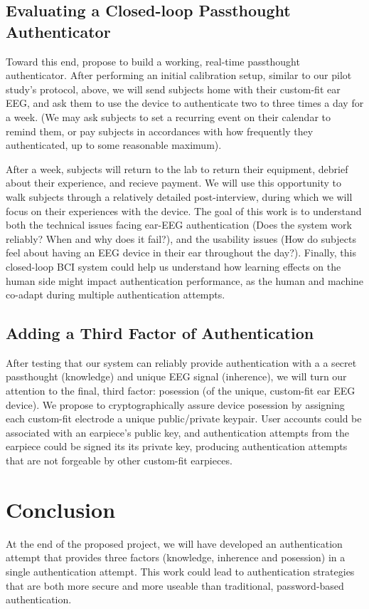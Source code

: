 \documentclass[11pt]{article}
\begin{document}
\subsection{Evaluating a Closed-loop Passthought Authenticator}
Toward this end, propose to build a working, real-time passthought authenticator.
After performing an initial calibration setup, similar to our pilot study's protocol, above,
we will send subjects home with their custom-fit ear EEG, and ask them to use the device to authenticate
two to three times a day for a week.
(We may ask subjects to set a recurring event on their calendar to remind them, 
or pay subjects in accordances with how frequently they authenticated, up to some reasonable maximum).

After a week, subjects will return to the lab to return their equipment, debrief about their experience, and recieve payment. We will use this opportunity to walk subjects through a relatively detailed post-interview,
during which we will focus on their experiences with the device. 
The goal of this work is to understand both the technical issues facing ear-EEG authentication
(Does the system work reliably? When and why does it fail?), and the usability issues
(How do subjects feel about having an EEG device in their ear throughout the day?).
Finally, this closed-loop BCI system could help us understand how learning effects
on the human side might impact authentication performance, as the human and machine
co-adapt during multiple authentication attempts.

\subsection{Adding a Third Factor of Authentication}
After testing that our system can reliably provide authentication with a 
a secret passthought (knowledge) and unique EEG signal (inherence),
we will turn our attention to the final, third factor: posession
(of the unique, custom-fit ear EEG device).
We propose to cryptographically assure device posession
by assigning each custom-fit electrode a unique public/private keypair. 
User accounts could be associated with an earpiece's public key,
and authentication attempts from the earpiece could be signed its
its private key, producing authentication attempts that are not
forgeable by other custom-fit earpieces. 

\section{Conclusion}
At the end of the proposed project,
we will have developed an authentication attempt that provides three factors
(knowledge, inherence and posession) in a single authentication attempt.
This work could lead to authentication strategies that are both more secure
and more useable than traditional, password-based authentication.
\end{document}
